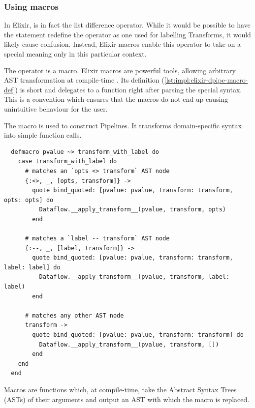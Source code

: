 \subsubsection{Using macros}

In Elixir, \exs{--} is in fact the list difference operator.
While it would be possible to have the  statement redefine the \exs{--} operator as one used for labelling Transforms, it would likely cause confusion.
Instead, Elixir macros enable this operator to take on a special meaning only in this particular context.

The \exs{~>} operator is a macro.
Elixir macros are powerful tools, allowing arbitrary AST transformation at compile-time \cite[p.~13]{Elixir-Metaprogramming}.
Its definition (\cref{lst:impl:elixir-dpipe-macro-def}) is short and delegates to a function right after parsing the special syntax.
This is a convention \cite[p.~7]{Elixir-Metaprogramming} which ensures that the macros do not end up causing unintuitive behaviour for the user.

\begin{listing}[h]
	\caption[The definition of the \exs{~>} macro for constructing Pipelines.]{The \exs{~>} macro is used to construct Pipelines. It transforms domain-specific syntax into simple function calls.}
	\label{lst:impl:elixir-dpipe-macro-def}
	\begin{verbatim}
  defmacro pvalue ~> transform_with_label do
    case transform_with_label do
      # matches an `opts <> transform` AST node
      {:<>, _, [opts, transform]} ->
        quote bind_quoted: [pvalue: pvalue, transform: transform, opts: opts] do
          Dataflow.__apply_transform__(pvalue, transform, opts)
        end
        
      # matches a `label -- transform` AST node
      {:--, _, [label, transform]} ->
        quote bind_quoted: [pvalue: pvalue, transform: transform, label: label] do
          Dataflow.__apply_transform__(pvalue, transform, label: label)
        end
      
      # matches any other AST node
      transform ->
        quote bind_quoted: [pvalue: pvalue, transform: transform] do
          Dataflow.__apply_transform__(pvalue, transform, [])
        end
    end
  end
	\end{verbatim}
\end{listing}

Macros are functions which, at compile-time, take the Abstract Syntax Trees (ASTs) of their arguments and output an AST with which the macro is replaced.

